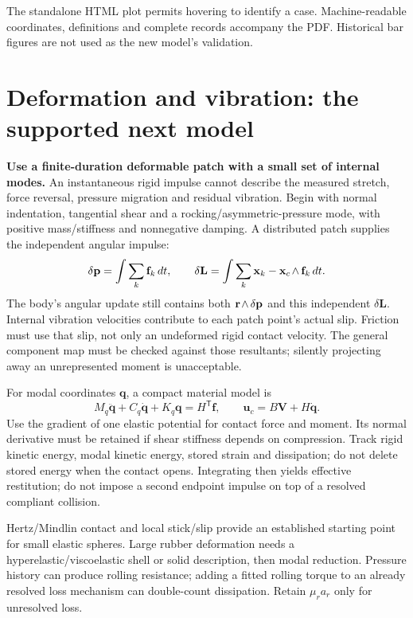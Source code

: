 \documentclass[10pt,a4paper]{article}
\newcommand{\rw}[1]{\mathord{#1\mkern2mu\wedge}}
\begin{document}
The standalone HTML plot permits hovering to identify a case. Machine-readable
coordinates, definitions and complete records accompany the PDF. Historical bar
figures are not used as the new model's validation.

\newpage
\section*{Deformation and vibration: the supported next model}

\textbf{Use a finite-duration deformable patch with a small set of internal modes.}
An instantaneous rigid impulse cannot describe the measured stretch, force reversal,
pressure migration and residual vibration. Begin with normal indentation, tangential
shear and a rocking/asymmetric-pressure mode, with positive mass/stiffness and
nonnegative damping. A distributed patch supplies the independent angular impulse:
\[
 \delta\mathbf p=\int\sum_k\mathbf f_k\,dt,\qquad
 \delta\mathbf L=\int\sum_k\rw{\mathbf x_k-\mathbf x_c}\,\mathbf f_k\,dt.
\]
The body's angular update still contains both $\rw{\mathbf r}\,\delta\mathbf p$
and this independent $\delta\mathbf L$. Internal vibration velocities contribute
to each patch point's actual slip. Friction must use that slip, not only an undeformed
rigid contact velocity. The general component map must be checked against those
resultants; silently projecting away an unrepresented moment is unacceptable.

For modal coordinates $\mathbf q$, a compact material model is
\[
 M_q\ddot{\mathbf q}+C_q\dot{\mathbf q}+K_q\mathbf q=H^{\mathsf T}\mathbf f,
 \qquad \mathbf u_c=B\mathbf V+H\dot{\mathbf q}.
\]
Use the gradient of one elastic potential for contact force and moment. Its normal
derivative must be retained if shear stiffness depends on compression. Track rigid
kinetic energy, modal kinetic energy, stored strain and dissipation; do not delete
stored energy when the contact opens. Integrating then yields effective restitution;
do not impose a second endpoint impulse on top of a resolved compliant collision.

Hertz/Mindlin contact and local stick/slip provide an established starting point for
small elastic spheres. Large rubber deformation needs a hyperelastic/viscoelastic
shell or solid description, then modal reduction. Pressure history can produce
rolling resistance; adding a fitted rolling torque to an already resolved loss
mechanism can double-count dissipation. Retain $\mu_r a_r$ only for unresolved loss.
\end{document}
